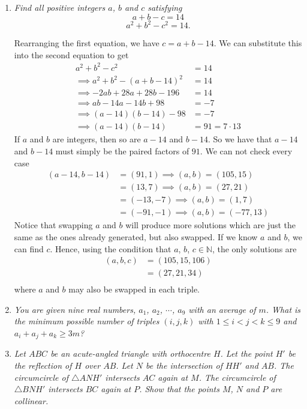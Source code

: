 \documentclass{article}
\begin{document}
\begin{enumerate}[1.]
\item %
{\itshape Find all positive integers $a$, $b$ and $c$ satisfying 
$$a + b - c = 14$$
$$a^2 + b^2 - c^2 = 14.$$}

Rearranging the first equation, we have $c = a + b - 14$. We can substitute this into the second equation to get 
\begin{align*}
  a^2 + b^2 - c^2 &= 14 \\
  \implies a^2 + b^2 - (a + b - 14)^2 &= 14 \\
  \implies -2ab + 28a + 28b - 196 &= 14 \\
  \implies ab - 14a - 14 b + 98 &= -7 \\
  \implies (a - 14)(b - 14) - 98 &= -7 \\
  \implies (a - 14)(b - 14) &= 91 = 7 \cdot 13
\end{align*}
If $a$ and $b$ are integers, then so are $a - 14$ and $b - 14$. So we have that $a - 14$ and $b - 14$ must simply be the paired factors of $91$. We can not check every case 
\begin{align*}
  (a - 14, b - 14) &= (91, 1) \implies (a, b) = (105, 15) \\
  &= (13, 7) \implies (a, b) = (27, 21) \\
  &= (-13, -7) \implies (a, b) = (1, 7) \\
  &= (-91, -1) \implies (a, b) = (-77, 13)
\end{align*}
Notice that swapping $a$ and $b$ will produce more solutions which are just the same as the ones already generated, but also swapped. If we know $a$ and $b$, we can find $c$. Hence, using the condition that $a$, $b$, $c \in \mathbb{N}$, the only solutions are
\begin{align*}
  (a, b, c) &= (105, 15, 106) \\
  &= (27, 21, 34) \\
\end{align*}
where $a$ and $b$ may also be swapped in each triple.

\item %
{\itshape You are given nine real numbers, $a_1$, $a_2$, $\cdots$, $a_9$ with an average of $m$. What is the minimum possible number of triples $(i, j, k)$ with $1 \le i < j < k \le 9$ and $a_i + a_j + a_k \ge 3m$?}


\item %
{\itshape Let $ABC$ be an acute-angled triangle with orthocentre $H$. Let the point $H'$ be the reflection of $H$ over $AB$. Let $N$ be the intersection of $HH'$ and $AB$. The circumcircle of $\triangle ANH'$ intersects $AC$ again at $M$. The circumcircle of $\triangle BNH'$ intersects $BC$ again at $P$. Show that the points $M$, $N$ and $P$ are collinear.}



\end{enumerate}
\end{document}
